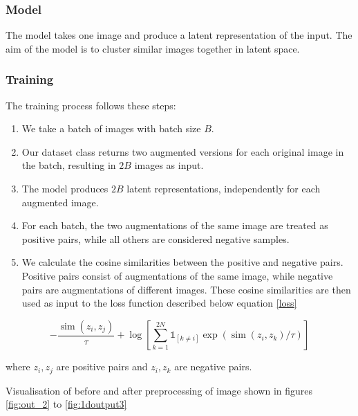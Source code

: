 \documentclass[a4paper,12pt]{report}
\begin{document}
\subsubsection{Model}
The model takes one image and produce a latent representation of the input. The aim of the model is to cluster similar images together in latent space.
\subsubsection{Training}
The training process follows these steps:

\begin{enumerate}
    \item We take a batch of images with batch size $B$.
    
    \item Our dataset class returns two augmented versions for each original image in the batch, resulting in $2B$ images as input.

    \item The model produces $2B$ latent representations, independently for each augmented image.

    \item For each batch, the two augmentations of the same image are treated as positive pairs, while all others are considered negative samples.

    \item We calculate the cosine similarities between the positive and negative pairs. Positive pairs consist of augmentations of the same image, 
    while negative pairs are augmentations of different images. These cosine similarities are then used as input to the loss function described below equation \ref{loss}
\end{enumerate}




\begin{equation}
  -\frac{\operatorname{sim}\left(z_{i}, z_{j}\right)}{\tau} + \log \left[\sum_{k=1}^{2 N} \mathbb{1}_{[k \neq i]} \exp \left(\operatorname{sim}\left(z_{i}, z_{k}\right) / \tau\right)\right]
  \label{loss}
\end{equation}
  
where $z_i, z_j$ are positive pairs and $z_i, z_k$ are negative pairs.

\vspace{1em}

Visualisation of before and after preprocessing of image shown in figures \ref{fig:out_2} to \ref{fig:1doutput3}
\end{document}
